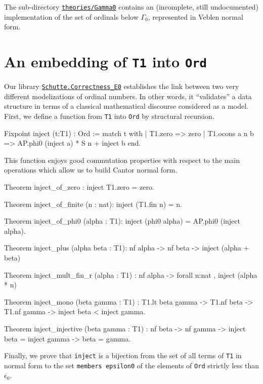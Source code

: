 {\begin{remark}
The sub-directory \href{../theories/html/hydras.Gamma0.html}%
{\texttt{theories/Gamma0}} contains an (incomplete, still undocumented) implementation of the set of ordinals below $\Gamma_0$, represented in Veblen normal form. 
\end{remark}

\section{An embedding of \texttt{T1} into \texttt{Ord}}


Our library 
\href{../theories/html/hydras.Schutte.correctness_E0.html}%
{\texttt{Schutte.Correctness\_E0}} establishes the link between two very different modelizations of ordinal numbers. In other words, it ``validates'' a data structure in terms of
a classical mathematical discourse considered as a model. 
First, we define a function from \texttt{T1} into  \texttt{Ord} by structural recursion.

\begin{Coqsrc}
Fixpoint inject (t:T1) : Ord :=
 match t with 
     | T1.zero => zero
     | T1.ocons a n b =>  AP.phi0 (inject a) * S n + inject b
 end.  
\end{Coqsrc}

This function enjoys good commutation properties with respect to the main operations which
allow us to build Cantor normal form.

\begin{Coqsrc}
Theorem inject_of_zero : inject T1.zero = zero.

Theorem inject_of_finite (n : nat):
  inject (T1.fin n) =  n.

Theorem inject_of_phi0 (alpha : T1):
  inject (phi0 alpha) = AP.phi0 (inject alpha).

Theorem inject_plus (alpha beta : T1): nf alpha -> nf beta ->
  inject (alpha + beta)%

Theorem inject_mult_fin_r (alpha : T1)  :
  nf alpha -> forall n:nat , inject (alpha *  n)%

Theorem inject_mono (beta gamma : T1) :
  T1.lt  beta gamma -> 
  T1.nf beta -> T1.nf gamma -> 
  inject beta < inject gamma.

Theorem inject_injective (beta gamma : T1) : nf beta -> nf gamma ->
  inject beta = inject gamma -> beta = gamma.
\end{Coqsrc}

Finally, we prove that \texttt{inject} is a bijection from the set of all terms of \texttt{T1} in normal form to the set 
\texttt{members epsilon0} of the elements of \texttt{Ord} strictly less than  $\epsilon_0$.

}
